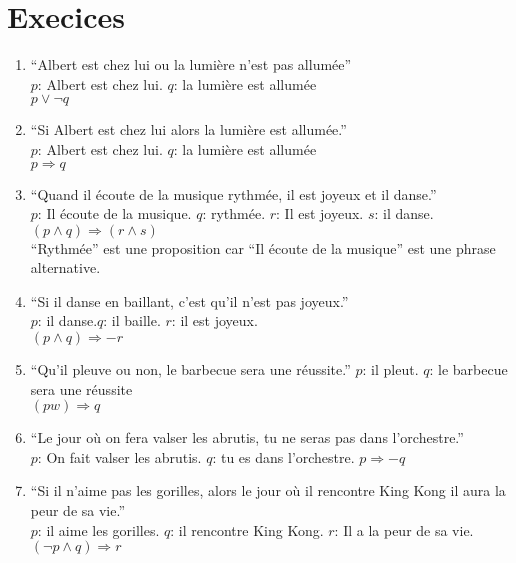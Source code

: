 \section{Execices}
\begin{enumerate}
	\item ``Albert est chez lui ou la lumière n'est pas allumée''\\
		$p$: Albert est chez lui. $q$:  la lumière est allumée\\
		$p \lor \lnot q$
	\item ``Si Albert est chez lui alors la lumière est allumée.'' \\
		$p$: Albert est chez lui. $q$:  la lumière est allumée\\
		$p \Rightarrow q$
	\item ``Quand il écoute de la musique rythmée, il est joyeux et il danse.''\\
		$p$: Il écoute de la musique. $q$: rythmée. $r$: Il est joyeux. $s$: il danse.\\
		$(p\land q) \Rightarrow (r \land s)$\\
		``Rythmée'' est une proposition car ``Il écoute de la musique'' est une phrase alternative.
	\item ``Si il danse en baillant, c'est qu'il n'est pas joyeux.''\\
		$p$: il danse.$q$: il baille. $r$: il est joyeux.\\
		$(p \land q) \Rightarrow -r$
	\item ``Qu'il pleuve ou non, le barbecue sera une réussite.''
		$p$: il pleut. $q$: le barbecue sera une réussite\\
		$(pw) \Rightarrow q$
	\item ``Le jour où on fera valser les abrutis, tu ne seras pas dans l'orchestre.''\\
		$p$: On fait valser les abrutis.  $q$: tu es dans l'orchestre.
		$p \Rightarrow -q$
	\item ``Si il n'aime pas les gorilles, alors le jour où il rencontre King Kong il aura la peur de sa vie.''\\
		$p$: il aime les gorilles. $q$: il rencontre King Kong. $r$: Il a la peur de sa vie.\\
		$(\lnot p \land q) \Rightarrow r$
\end{enumerate}
